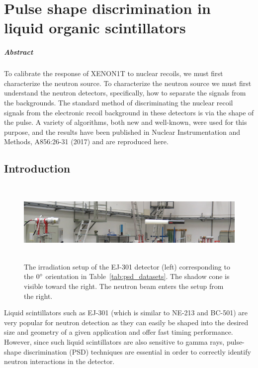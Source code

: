 
\chapter{Pulse shape discrimination in liquid organic scintillators}

\paragraph{Abstract} To calibrate the response of XENON1T to nuclear recoils, we must first characterize the neutron source. To characterize the neutron source we must first understand the neutron detectors, specifically, how to separate the signals from the backgrounds. The standard method of discriminating the nuclear recoil signals from the electronic recoil background in these detectors is via the shape of the pulse. A variety of algorithms, both new and well-known, were used for this purpose, and the results have been published in Nuclear Instrumentation and Methods, A856:26-31 (2017) and are reproduced here.

\section{Introduction}

\begin{figure}[htbp]
\centering
    \includegraphics[width=\textwidth,height=4cm]{figures/psd/fig_ptb_setup}
    \caption{The irradiation setup of the EJ-301 detector (left) corresponding to the $0{}^{\circ}$ orientation in Table~\ref{tab:psd_datasets}. The shadow cone is visible toward the right. The neutron beam enters the setup from the right.}\label{fig:psd_detector_setup}
\end{figure}

Liquid scintillators such as EJ-301 (which is similar to NE-213 and BC-501) are very popular for neutron detection as they can easily be shaped into the desired size and geometry of a given application and offer fast timing performance. However, since such liquid scintillators are also sensitive to gamma rays, pulse-shape discrimination (PSD) techniques are essential in order to correctly identify neutron interactions in the detector.

